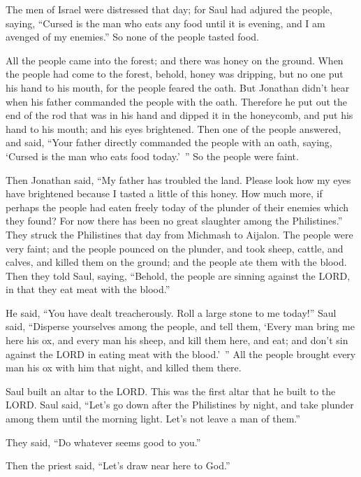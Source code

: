 \myverse{}The men of Israel were distressed that day; for Saul had adjured
the people, saying, “Cursed is the man who eats any food until it is evening, and I am avenged of my enemies.”
So none of the people tasted food.

\myverse{}All the people came into the forest; and there was honey on
the ground.
\myverse{}When the people had come to the forest, behold, honey was dripping, but no
one put his hand to his mouth, for the people feared the oath.
\myverse{}But Jonathan didn’t hear when his father commanded the people with the oath.
Therefore he put out the end of the rod that was in his hand and dipped it in the honeycomb, and put his
hand to his mouth; and his eyes brightened.
\myverse{}Then one of the people answered, and said, “Your father directly commanded
the people with an oath, saying, ‘Cursed is the man who eats food today.’ ” So the people were faint.

\myverse{}Then Jonathan said, “My father has troubled the land. Please
look how my eyes have brightened because I tasted a little of this honey.
\myverse{}How much more, if perhaps the people had eaten freely today of the plunder
of their enemies which they found? For now there has been no great slaughter among the Philistines.”
\myverse{}They struck the Philistines that day from Michmash to Aijalon. The people
were very faint;
\myverse{}and the people pounced on the plunder, and took sheep, cattle, and calves,
and killed them on the ground; and the people ate them with the blood.
\myverse{}Then they told Saul, saying, “Behold, the people are sinning against the
LORD, in that they eat meat with the blood.”

He said, “You have dealt treacherously. Roll a large stone to me today!”
\myverse{}Saul said, “Disperse yourselves among the people, and tell them, ‘Every man
bring me here his ox, and every man his sheep, and kill them here, and eat; and don’t sin against the
LORD in eating meat with the blood.’ ” All the people brought every man his ox with him that night, and
killed them there.

\myverse{}Saul built an altar to the LORD. This was the first altar that
he built to the LORD.
\myverse{}Saul said, “Let’s go down after the Philistines by night, and take plunder
among them until the morning light. Let’s not leave a man of them.”

They said, “Do whatever seems good to you.”

Then the priest said, “Let’s draw near here to God.”

